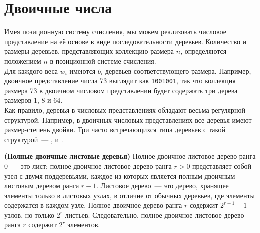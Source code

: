 \begin{frame}[fragile]{}
\inputminted{haskell}{code/DenseNumbers.hs}
\end{frame}

\begin{frame}[fragile]{}
\inputminted{haskell}{code/SparseByWeight.hs}
\end{frame}


\section{Двоичные числа}
\label{sc:9.2}

\begin{frame}[fragile]{}


Имея позиционную систему счисления, мы можем реализовать числовое
представление на её основе в виде последовательности
деревьев. Количество и размеры деревьев, представляющих коллекцию
размера $n$, определяются положением $n$ в позиционной системе
счисления. \\

Для каждого веса $w_i$ имеются $b_i$ деревьев
соответствующего размера. Например, двоичное представление числа 73
выглядит как \texttt{1001001}, так что коллекция размера 73 в двоичном
числовом представлении будет содержать три дерева размеров 1, 8 и 64.\\

Как правило, деревья в числовых представлениях обладают весьма
регулярной структурой. Например, в двоичных числовых представлениях
все деревья имеют размер-степень двойки. Три часто встречающихся типа
деревьев с такой структурой~---  \cite{KaldewaijDielissen1996},  \cite{Vuillemin1978} и
 \cite{SackStrothotte1990}.

\end{frame}

\begin{frame}[fragile]{}

\begin{definition}
  \textbf{(Полные двоичные листовые деревья)} Полное двоичное листовое
  дерево ранга 0~--- это лист; полное двоичное листовое дерево ранга
  $r > 0$ представляет собой узел с двумя поддеревьями, каждое из
  которых является полным двоичным листовым деревом ранга $r -
  1$. Листовое дерево~--- это дерево, хранящее элементы только в
  листовых узлах, в отличие от обычных деревьев, где элементы
  содержатся в каждом узле. Полное двоичное дерево ранга $r$ содержит
  $2^{r+1} - 1$ узлов, но только $2^r$ листьев. Следовательно, полное
  двоичное листовое дерево ранга $r$ содержит $2^r$ элементов.
\end{definition}
\end{frame}

